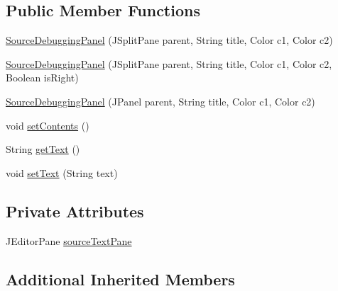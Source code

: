 \subsection*{Public Member Functions}
\begin{DoxyCompactItemize}
\item 
\hyperlink{classit_1_1emarolab_1_1cagg_1_1debugging_1_1baseComponents_1_1customPanel_1_1SourceDebuggingPanel_a56173cd382efadfa3c1153d14390c583}{Source\-Debugging\-Panel} (J\-Split\-Pane parent, String title, Color c1, Color c2)
\item 
\hyperlink{classit_1_1emarolab_1_1cagg_1_1debugging_1_1baseComponents_1_1customPanel_1_1SourceDebuggingPanel_a8d35dca2262b8764569a933cac8396bf}{Source\-Debugging\-Panel} (J\-Split\-Pane parent, String title, Color c1, Color c2, Boolean is\-Right)
\item 
\hyperlink{classit_1_1emarolab_1_1cagg_1_1debugging_1_1baseComponents_1_1customPanel_1_1SourceDebuggingPanel_a051763e0f3d04267eed4c7fb5f659997}{Source\-Debugging\-Panel} (J\-Panel parent, String title, Color c1, Color c2)
\item 
void \hyperlink{classit_1_1emarolab_1_1cagg_1_1debugging_1_1baseComponents_1_1customPanel_1_1SourceDebuggingPanel_a49e541e451df6b8f957b69a02421fbe0}{set\-Contents} ()
\item 
String \hyperlink{classit_1_1emarolab_1_1cagg_1_1debugging_1_1baseComponents_1_1customPanel_1_1SourceDebuggingPanel_a6b33d2e06f2b8818638b5940afc59a99}{get\-Text} ()
\item 
void \hyperlink{classit_1_1emarolab_1_1cagg_1_1debugging_1_1baseComponents_1_1customPanel_1_1SourceDebuggingPanel_ac6fd327078d389125c8f8feca9d5683b}{set\-Text} (String text)
\end{DoxyCompactItemize}
\subsection*{Private Attributes}
\begin{DoxyCompactItemize}
\item 
J\-Editor\-Pane \hyperlink{classit_1_1emarolab_1_1cagg_1_1debugging_1_1baseComponents_1_1customPanel_1_1SourceDebuggingPanel_abb765e05fee2da3794c30a407577329b}{source\-Text\-Pane}
\end{DoxyCompactItemize}
\subsection*{Additional Inherited Members}


